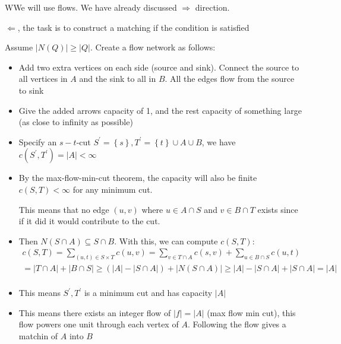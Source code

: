 \begin{prf}
  WWe will use flows. We have already discussed $\Rightarrow$ direction.
  \par\bigskip
  \noindent $\Leftarrow$, the task is to construct a matching if the condition is satisfied
  \par\bigskip
  \noindent Assume $\left|N(Q)\right|\geq\left|Q\right|$. Create a flow network as follows:\par
  \begin{itemize}
    \item Add two extra vertices on each side (source and sink). Connect the source to all vertices in $A$ and the sink to all in $B$. All the edges flow from the source to sink\par
    \item Give the added arrows capacity of 1, and the rest capacity of something large (as close to infinity as possible)\par
  \item Specify an $s-t$-cut $S^{\prime} = \left\{s\right\}, T^{\prime} = \left\{t\right\}\cup A\cup B$, we have $c(S^{\prime},T^{\prime}) = \left|A\right|<\infty$\par
  \item By the max-flow-min-cut theorem, the capacity will also be finite $c(S,T)<\infty$ for any minimum cut.\par
    \noindent This means that no edge $(u,v)$ where $u\in A\cap S$ and $v\in B\cap T$ exists since if it did it would contribute to the cut.\par
  \item Then $N(S\cap A)\subseteq S\cap B$. With this, we can compute $c(S,T)$:
    \begin{equation*}
      \begin{gathered}
        c(S,T) = \sum_{(u,t)\in S\times T} c(u,v) = \sum_{v\in T\cap A} c(s,v)+ \sum_{u\in B\cap S}c(u,t)\\
        = \left|T\cap A\right| + \left|B\cap S\right|\geq (\left|A\right|-\left|S\cap A\right|) + \left|N(S\cap A)\right|\geq \left|A\right|-\left|S\cap A\right|+\left|S\cap A\right| = \left|A\right|\\
      \end{gathered}
    \end{equation*}\par
  \item This means $S^{\prime}, T^{\prime}$ is a minimum cut and has capacity $\left|A\right|$\par
  \item This means there exists an integer flow of $\left|f\right| = \left|A\right|$ (max flow min cut), this flow powers one unit through each vertex of $A$. Following the flow gives a matchin of $A$ into $B$
  \end{itemize}
\end{prf}
